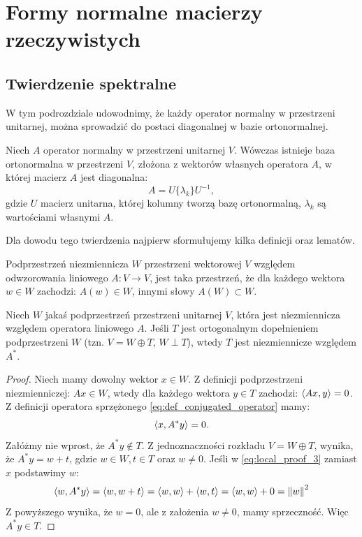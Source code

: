 \chapter{Formy normalne macierzy rzeczywistych}

\section{Twierdzenie spektralne}
W tym podrozdziale udowodnimy, że każdy operator normalny w przestrzeni unitarnej, można sprowadzić do postaci diagonalnej w bazie ortonormalnej.

\begin{theorem}[Spektralne]
    Niech $A$ operator normalny w przestrzeni unitarnej $V$. Wówczas istnieje baza ortonormalna w przestrzeni $V$, złożona z wektorów własnych operatora $A$, w której macierz $A$ jest diagonalna:
    $$A = U\{\lambda_k\}U^{-1},$$
    gdzie $U$ macierz unitarna, której kolumny tworzą bazę ortonormalną, $\lambda_k$ są wartościami własnymi $A$.
\end{theorem}
Dla dowodu tego twierdzenia najpierw sformułujemy kilka definicji oraz lematów.

\begin{definition}
    Podprzestrzeń niezmiennicza $W$ przestrzeni wektorowej $V$ względem odwzorowania liniowego $A \colon V \to V$, jest taka przestrzeń, że dla każdego wektora $w \in W$ zachodzi: $A(w) \in W$, innymi słowy $A(W) \subset W$.
\end{definition}

\begin{lemma}\label{lemma:invariant_ortogonal_space_for_norm_ops}
    Niech $W$ jakaś podprzestrzeń przestrzeni unitarnej $V$, która jest niezmiennicza względem operatora liniowego $A$. Jeśli $T$ jest ortogonalnym dopełnieniem podprzestrzeni $W$ (tzn. $V = W \oplus T$, $W \perp T$), wtedy $T$ jest niezmiennicze względem $A^*$.
\end{lemma}
\begin{proof}
    Niech mamy dowolny wektor $x \in W$. Z definicji podprzestrzeni niezmienniczej: $Ax \in W$, wtedy dla każdego wektora $y \in T$ zachodzi: $\left\langle Ax, y \right\rangle = 0$. Z definicji operatora sprzężonego \eqref{eq:def_conjugated_operator} mamy: 
    \begin{equation}\label{eq:local_proof_3}
        \left\langle x, A^*y \right\rangle = 0.
    \end{equation} 
    Załóżmy nie wprost, że $A^*y \notin T$. Z jednoznaczności rozkładu $V = W \oplus T$, wynika, że $A^*y = w + t$, gdzie $w \in W, t \in T$ oraz $w \neq 0$. Jeśli w \eqref{eq:local_proof_3} zamiast $x$ podstawimy $w$:
    $$ \left\langle w, A^*y \right\rangle = \left\langle w, w + t \right\rangle = \left\langle w, w \right\rangle + \left\langle w, t \right\rangle = \left\langle w, w \right\rangle + 0 = \left\| w \right\|^2$$
    Z powyższego wynika, że $w = 0$, ale z założenia $w \neq 0$, mamy sprzeczność. Więc $A^*y \in T$.
\end{proof}

